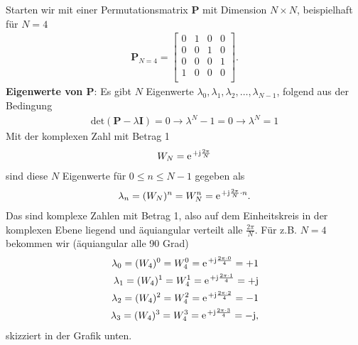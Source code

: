 Starten wir mit einer Permutationsmatrix $\bm{P}$ mit Dimension $N \times N$,
beispielhaft für $N=4$
\begin{align}
\bm{P}_{N=4} =
\begin{bmatrix}
0 & 1 & 0 & 0\\
0 & 0 & 1 & 0\\
0 & 0 & 0 & 1\\
1 & 0 & 0 & 0\\
\end{bmatrix}.
\end{align}
%
\textbf{Eigenwerte von $\bm{P}$}:
Es gibt $N$ Eigenwerte $\lambda_{0}, \lambda_{1}, \lambda_{2}, \dots, \lambda_{N-1}$,
folgend aus der Bedingung
\begin{align}
\mathrm{det}(\bm{P}-\lambda \bm{I}) = 0 \rightarrow \lambda^N - 1 = 0 \rightarrow \lambda^N = 1
\end{align}
%
Mit der komplexen Zahl mit Betrag 1
\begin{align}
W_N = \e^{+\im\frac{2\pi}{N}}
\end{align}
sind diese $N$ Eigenwerte für $0\leq n \leq N-1$ gegeben als
\begin{align}
\lambda_n =(W_N)^n = W_N^n = \e^{+\im\frac{2\pi}{N}\cdot n}.
\end{align}
Das sind komplexe Zahlen mit Betrag 1, also auf dem Einheitskreis in der komplexen
Ebene liegend und äquiangular verteilt alle $\frac{2\pi}{N}$.
%
Für z.B. $N=4$ bekommen wir (äquiangular alle 90 Grad)
\begin{align}
\lambda_0 =(W_4)^0 = W_4^0 = \e^{+\im\frac{2\pi\cdot 0}{4}} = +1\nonumber\\
\lambda_1 =(W_4)^1 = W_4^1 = \e^{+\im\frac{2\pi\cdot 1}{4}} = +\im\nonumber\\
\lambda_2 =(W_4)^2 = W_4^2 = \e^{+\im\frac{2\pi\cdot 2}{4}} = -1\nonumber\\
\lambda_3 =(W_4)^3 = W_4^3 = \e^{+\im\frac{2\pi\cdot 3}{4}} = -\im,
\end{align}
skizziert in der Grafik unten.
\begin{center}
\end{center}


